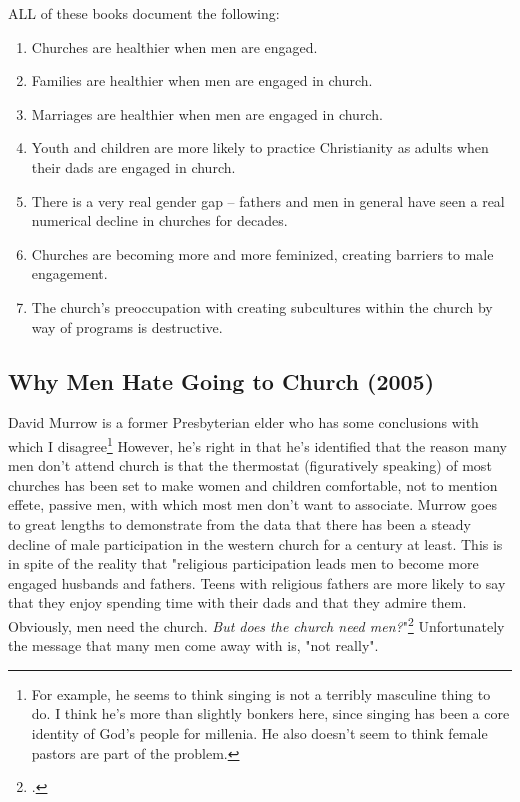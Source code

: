 ALL of these books document the following:
\begin{enumerate}
  \item Churches are healthier when men are engaged.
  \item Families are healthier when men are engaged in church.
  \item Marriages are healthier when men are engaged in church.
  \item Youth and children are more likely to practice Christianity as adults when their dads are engaged in church.
  \item There is a very real gender gap -- fathers and men in general have seen a real numerical decline in churches for decades.
  \item Churches are becoming more and more feminized, creating barriers to male engagement.
  \item The church's preoccupation with creating subcultures within the church by way of programs is destructive.
\end{enumerate}

\subsection{Why Men Hate Going to Church (2005)}
David Murrow is a former Presbyterian elder who has some conclusions with which I disagree\footnote{For example, he seems to think singing is not a terribly masculine thing to do.  I think he's more than slightly bonkers here, since singing has been a core identity of God's people for millenia.  He also doesn't seem to think female pastors are part of the problem.}  However, he's right in that he's identified that the reason many men don't attend church is that the thermostat (figuratively speaking) of most churches has been set to make women and children comfortable, not to mention effete, passive men, with which most men don't want to associate. Murrow goes to great lengths to demonstrate from the data that there has been a steady decline of male participation in the western church for a century at least.  This is in spite of the reality that "religious participation leads men to become more engaged husbands and fathers.  Teens with religious fathers are more likely to say that they enjoy spending time with their dads and that they admire them.  Obviously, men need the church. \textit{But does the church need men?}"\footcite[p. 23, emphasis mine]{murrowmen}  Unfortunately the message that many men come away with is, "not really".

